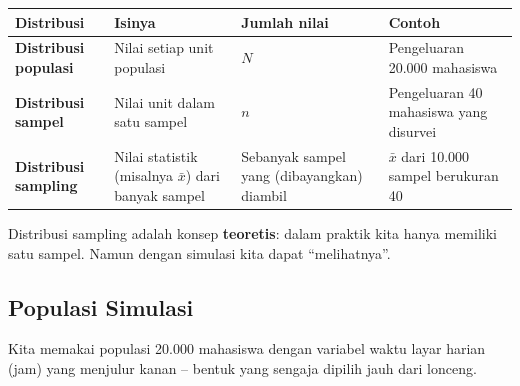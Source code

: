 \documentclass[
  indonesian,
  letterpaper,
]{book}
\newcounter{none} %
\begin{document}
{\def\LTcaptype{none} %
\begin{longtable}[]{@{}
  >{\raggedright\arraybackslash}p{}
  >{\raggedright\arraybackslash}p{}
  >{\centering\arraybackslash}p{}
  >{\raggedright\arraybackslash}p{}@{}}
\toprule\noalign{}
\begin{minipage}[b]{\linewidth}\raggedright
Distribusi
\end{minipage} & \begin{minipage}[b]{\linewidth}\raggedright
Isinya
\end{minipage} & \begin{minipage}[b]{\linewidth}\centering
Jumlah nilai
\end{minipage} & \begin{minipage}[b]{\linewidth}\raggedright
Contoh
\end{minipage} \\
\midrule\noalign{}
\endhead
\bottomrule\noalign{}
\endlastfoot
\textbf{Distribusi populasi} & Nilai setiap unit populasi & \(N\) &
Pengeluaran 20.000 mahasiswa \\
\textbf{Distribusi sampel} & Nilai unit dalam satu sampel & \(n\) &
Pengeluaran 40 mahasiswa yang disurvei \\
\textbf{Distribusi sampling} & Nilai statistik (misalnya \(\bar{x}\))
dari banyak sampel & Sebanyak sampel yang (dibayangkan) diambil &
\(\bar{x}\) dari 10.000 sampel berukuran 40 \\
\end{longtable}
}

Distribusi sampling adalah konsep \textbf{teoretis}: dalam praktik kita
hanya memiliki satu sampel. Namun dengan simulasi kita dapat
``melihatnya''.

\subsection{Populasi Simulasi}\label{populasi-simulasi}

Kita memakai populasi 20.000 mahasiswa dengan variabel waktu layar
harian (jam) yang menjulur kanan -- bentuk yang sengaja dipilih jauh
dari lonceng.
\end{document}
